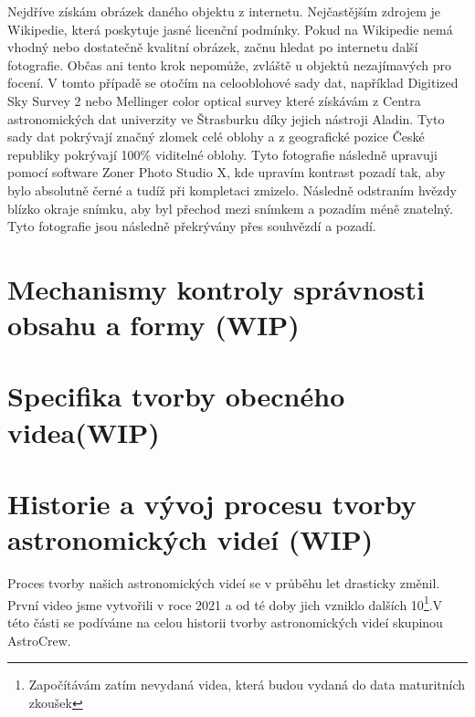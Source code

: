 \documentclass[12pt,a4paper,titlepage]{article}
\begin{document}
Nejdříve získám obrázek daného objektu z internetu. Nejčastějším zdrojem je Wikipedie, která poskytuje jasné licenční podmínky. Pokud na Wikipedie nemá vhodný nebo dostatečně kvalitní obrázek, začnu hledat po internetu další fotografie. Občas ani tento krok nepomůže, zvláště u objektů nezajímavých pro focení. V tomto případě se otočím na celooblohové sady dat, například Digitized Sky Survey 2 nebo Mellinger color optical survey které získávám z Centra astronomických dat univerzity ve Štrasburku díky jejich nástroji Aladin. Tyto sady dat pokrývají značný zlomek celé oblohy a z geografické pozice České republiky pokrývají 100\% viditelné oblohy. Tyto fotografie následně upravuji pomocí software Zoner Photo Studio X, kde upravím kontrast pozadí tak, aby bylo absolutně černé a tudíž při kompletaci zmizelo. Následně odstraním hvězdy blízko okraje snímku, aby byl přechod mezi snímkem a pozadím méně znatelný. Tyto fotografie jsou následně překrývány přes souhvězdí a pozadí. 
\section{Mechanismy kontroly správnosti obsahu a formy (WIP)}
\section{Specifika tvorby obecného videa(WIP)}
\section{Historie a vývoj procesu tvorby astronomických videí (WIP)}
Proces tvorby našich astronomických videí se v průběhu let drasticky změnil. První video jsme vytvořili v roce 2021 a od té doby jich vzniklo dalších 10\footnote{Započítávám zatím nevydaná videa, která budou vydaná do data maturitních zkoušek}.V této části se podíváme na celou historii tvorby astronomických videí skupinou AstroCrew.
\end{document}
